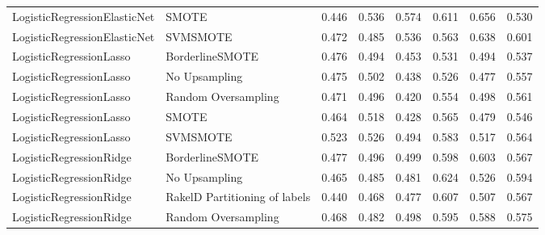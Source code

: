 \begin{tabular}{llllllll}
   LogisticRegressionElasticNet &                         SMOTE & 0.446 &                     0.536 &                 0.574 &                  0.611 &                                   0.656 &     0.530 \\
   LogisticRegressionElasticNet &                      SVMSMOTE & 0.472 &                     0.485 &                 0.536 &                  0.563 &                                   0.638 &     0.601 \\
        LogisticRegressionLasso &               BorderlineSMOTE & 0.476 &                     0.494 &                 0.453 &                  0.531 &                                   0.494 &     0.537 \\
        LogisticRegressionLasso &                 No Upsampling & 0.475 &                     0.502 &                 0.438 &                  0.526 &                                   0.477 &     0.557 \\
        LogisticRegressionLasso &           Random Oversampling & 0.471 &                     0.496 &                 0.420 &                  0.554 &                                   0.498 &     0.561 \\
        LogisticRegressionLasso &                         SMOTE & 0.464 &                     0.518 &                 0.428 &                  0.565 &                                   0.479 &     0.546 \\
        LogisticRegressionLasso &                      SVMSMOTE & 0.523 &                     0.526 &                 0.494 &                  0.583 &                                   0.517 &     0.564 \\
        LogisticRegressionRidge &               BorderlineSMOTE & 0.477 &                     0.496 &                 0.499 &                  0.598 &                                   0.603 &     0.567 \\
        LogisticRegressionRidge &                 No Upsampling & 0.465 &                     0.485 &                 0.481 &                  0.624 &                                   0.526 &     0.594 \\
        LogisticRegressionRidge & RakelD Partitioning of labels & 0.440 &                     0.468 &                 0.477 &                  0.607 &                                   0.507 &     0.567 \\
        LogisticRegressionRidge &           Random Oversampling & 0.468 &                     0.482 &                 0.498 &                  0.595 &                                   0.588 &     0.575 \\

\end{tabular}
